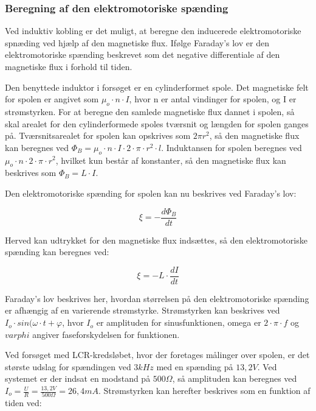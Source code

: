 \subsubsection{Beregning af den elektromotoriske spænding}

Ved induktiv kobling er det muligt, at beregne den inducerede elektromotoriske spnæding ved hjælp af den magnetiske flux. Ifølge Faraday's lov er den elektromotoriske spænding beskrevet som det negative differentiale af den magnetiske flux i forhold til tiden.

Den benyttede induktor i forsøget er en cylinderformet spole. Det magnetiske felt for spolen er angivet som $\mu_o \cdot n \cdot I$, hvor n er antal vindinger for spolen, og I er strømstyrken. For at beregne den samlede magnetiske flux dannet i spolen, så skal arealet for den cylinderformede spoles tværsnit og længden for spolen ganges på. Tværsnitsarealet for spolen kan opskrives som $2 \pi r^2$, så den magnetiske flux kan beregnes ved $\Phi_B = \mu_o \cdot n \cdot I \cdot 2 \cdot \pi \cdot r^2 \cdot l$. Induktansen for spolen beregnes ved $\mu_o \cdot n \cdot 2 \cdot \pi \cdot r^2$, hvilket kun består af konstanter, så den magnetiske flux kan beskrives som $\Phi_B = L \cdot I$.

Den elektromotoriske spænding for spolen kan nu beskrives ved Faraday's lov:

\begin{equation}
\xi = - \frac{d\Phi_B}{dt}
\end{equation}

Herved kan udtrykket for den magnetiske flux indsættes, så den elektromotoriske spænding kan beregnes ved:

\begin{equation}
\xi = - L \cdot \frac{dI}{dt}
\end{equation}

Faraday's lov beskrives her, hvordan størrelsen på den elektromotoriske spænding er afhængig af en varierende strømstyrke. Strømstyrken kan beskrives ved $I_o \cdot sin(\omega \cdot t + \varphi$, hvor $I_o$ er amplituden for sinusfunktionen, omega er $2 \cdot \pi \cdot f$ og $varphi$ angiver faseforskydelsen for funktionen.

Ved forsøget med LCR-kredsløbet, hvor der foretages målinger over spolen, er det største udslag for spændingen ved $3 kHz$ med en spænding på $13,2 V$. Ved systemet er der indsat en modstand på $500 \Omega$, så amplituden kan beregnes ved $I_o = \frac{U}{R} = \frac{13,2 V}{500 \Omega} = 26,4 mA$. Strømstyrken kan herefter beskrives som en funktion af tiden ved:

